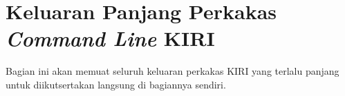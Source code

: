 \chapter{Keluaran Panjang Perkakas \textit{Command Line} KIRI}
\label{lamp:B}

Bagian ini akan memuat seluruh keluaran perkakas \cl\xspace KIRI yang terlalu panjang untuk diikutsertakan langsung di bagiannya sendiri.




